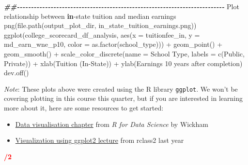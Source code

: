 \documentclass[
]{article}
\newenvironment{Shaded}{\begin{snugshade}}{\end{snugshade}}
\newcommand{\AttributeTok}[1]{\textcolor[rgb]{0.77,0.63,0.00}{#1}}
\newcommand{\ControlFlowTok}[1]{\textcolor[rgb]{0.13,0.29,0.53}{\textbf{#1}}}
\newcommand{\DocumentationTok}[1]{\textcolor[rgb]{0.56,0.35,0.01}{\textbf{\textit{#1}}}}
\newcommand{\FunctionTok}[1]{\textcolor[rgb]{0.00,0.00,0.00}{#1}}
\newcommand{\NormalTok}[1]{#1}
\newcommand{\SpecialCharTok}[1]{\textcolor[rgb]{0.00,0.00,0.00}{#1}}
\newcommand{\StringTok}[1]{\textcolor[rgb]{0.31,0.60,0.02}{#1}}
\providecommand{\tightlist}{%
  \setlength{\itemsep}{0pt}\setlength{\parskip}{0pt}}
\begin{document}
\begin{Shaded}
\begin{Highlighting}[]
\DocumentationTok{\#\#{-}{-}{-}{-}{-}{-}{-}{-}{-}{-}{-}{-}{-}{-}{-}{-}{-}{-}{-}{-}{-}{-}{-}{-}{-}{-}{-}{-}{-}{-}{-}{-}{-}{-}{-}{-}{-}{-}{-}{-}{-}{-}{-}{-}{-}{-}{-}{-}{-}{-}{-}{-}{-}{-}{-}{-}{-}{-}{-}{-}{-}{-}{-}{-}{-}{-}{-}{-}{-}{-}{-}{-}{-}{-}}
\NormalTok{Plot relationship between }\ControlFlowTok{in}\SpecialCharTok{{-}}\NormalTok{state tuition and median earnings}
\FunctionTok{png}\NormalTok{(}\FunctionTok{file.path}\NormalTok{(output\_plot\_dir, }\StringTok{\textquotesingle{}in\_state\_tuition\_earnings.png\textquotesingle{}}\NormalTok{))}
\FunctionTok{ggplot}\NormalTok{(college\_scorecard\_df\_analysis, }\FunctionTok{aes}\NormalTok{(}\AttributeTok{x =}\NormalTok{ tuitionfee\_in, }\AttributeTok{y =}\NormalTok{ md\_earn\_wne\_p10, }\AttributeTok{color =} \FunctionTok{as.factor}\NormalTok{(school\_type))) }\SpecialCharTok{+}
  \FunctionTok{geom\_point}\NormalTok{() }\SpecialCharTok{+}
  \FunctionTok{geom\_smooth}\NormalTok{() }\SpecialCharTok{+}
  \FunctionTok{scale\_color\_discrete}\NormalTok{(}\AttributeTok{name =} \StringTok{\textquotesingle{}School Type\textquotesingle{}}\NormalTok{, }\AttributeTok{labels =} \FunctionTok{c}\NormalTok{(}\StringTok{\textquotesingle{}Public\textquotesingle{}}\NormalTok{, }\StringTok{\textquotesingle{}Private\textquotesingle{}}\NormalTok{)) }\SpecialCharTok{+}
  \FunctionTok{xlab}\NormalTok{(}\StringTok{\textquotesingle{}Tuition (In{-}State)\textquotesingle{}}\NormalTok{) }\SpecialCharTok{+} \FunctionTok{ylab}\NormalTok{(}\StringTok{\textquotesingle{}Earnings 10 years after completion\textquotesingle{}}\NormalTok{)}
\FunctionTok{dev.off}\NormalTok{()}
\end{Highlighting}
\end{Shaded}

\emph{Note}: These plots above were created using the R library
\texttt{ggplot}. We won't be covering plotting in this course this
quarter, but if you are interested in learning more about it, here are
some resources to get started:

\begin{itemize}
\tightlist
\item
  \href{https://r4ds.had.co.nz/data-visualisation.html}{Data
  visualisation chapter} from \emph{R for Data Science} by Wickham
\item
  \href{https://anyone-can-cook.github.io/rclass2/lectures/ggplot/ggplot.html}{Visualization
  using ggplot2 lecture} from rclass2 last year
\end{itemize}

\textcolor{red}{\textbf{/2}}
\end{document}
